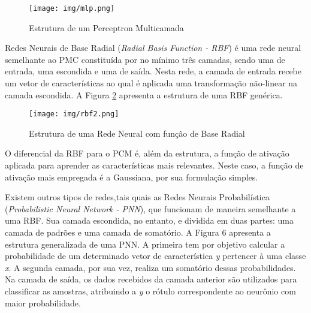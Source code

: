 \begin{figure}[ht!]
	\caption{\label{fig:pmc}Estrutura de um Perceptron Multicamada}
	\begin{center}
		\texttt{[image: img/mlp.png]}
	\end{center}
\end{figure}

Redes Neurais de Base Radial (\textit{Radial Basis Function - RBF}) é uma rede neural semelhante ao PMC constituída por no mínimo três camadas, sendo uma de entrada, uma escondida e uma de saída. Nesta rede, a camada de entrada recebe um vetor de características ao qual é aplicada uma transformação não-linear na camada escondida. A Figura \ref{fig:rbf2} apresenta a estrutura de uma RBF genérica. 

\begin{figure}[htb]
	\caption{\label{fig:rbf2}Estrutura de uma Rede Neural com função de Base Radial}
	\begin{center}
		\texttt{[image: img/rbf2.png]}
	\end{center}
\end{figure}

O diferencial da RBF para o PCM é, além da estrutura, a função de ativação aplicada para aprender as características mais relevantes. Neste caso, a função de ativação mais empregada é a Gaussiana, por sua formulação simples. 

Existem outros tipos de redes,tais quais as Redes Neurais Probabilística (\textit{Probabilistic Neural Network - PNN})\cite{specht1990probabilistic}, que funcionam de maneira semelhante a uma RBF. Sua camada escondida, no entanto, e dividida em duas partes: uma camada de padrões e uma camada de somatório. A Figura 6 apresenta a estrutura generalizada de uma PNN. A primeira tem por objetivo calcular a probabilidade de um determinado vetor de característica \textit{y} pertencer à uma classe \textit{x}. A segunda camada, por sua vez, realiza um somatório dessas probabilidades. Na camada de saída, os dados recebidos da camada anterior são utilizados para classificar as amostras, atribuindo a \textit{y} o rótulo correspondente ao neurônio com maior probabilidade.

